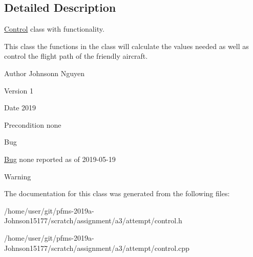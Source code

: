 \subsection{Detailed Description}
\hyperlink{classControl}{Control} class with functionality. 

This class the functions in the class will calculate the values needed as well as control the flight path of the friendly aircraft. ~\newline
\begin{DoxyAuthor}{Author}
Johnsonn Nguyen 
\end{DoxyAuthor}
\begin{DoxyVersion}{Version}
1 
\end{DoxyVersion}
\begin{DoxyDate}{Date}
2019 
\end{DoxyDate}
\begin{DoxyPrecond}{Precondition}
none 
\end{DoxyPrecond}
\begin{DoxyRefDesc}{Bug}
\item[\hyperlink{bug__bug000001}{Bug}]none reported as of 2019-\/05-\/19 \end{DoxyRefDesc}
\begin{DoxyWarning}{Warning}

\end{DoxyWarning}


The documentation for this class was generated from the following files\+:\begin{DoxyCompactItemize}
\item 
/home/user/git/pfms-\/2019a-\/\+Johnson15177/scratch/assignment/a3/attempt/control.\+h\item 
/home/user/git/pfms-\/2019a-\/\+Johnson15177/scratch/assignment/a3/attempt/control.\+cpp\end{DoxyCompactItemize}

